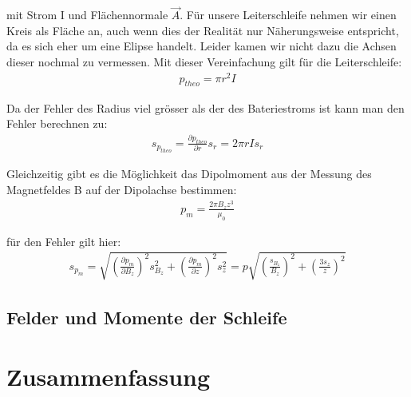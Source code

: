 \documentclass[12pt]{article}
\begin{document}
mit Strom I und Flächennormale $\vec{A}$. Für unsere Leiterschleife nehmen wir einen Kreis als Fläche an, auch wenn dies der Realität nur Näherungsweise entspricht, da es sich eher um eine Elipse handelt. Leider kamen wir nicht dazu die Achsen dieser nochmal zu vermessen. Mit dieser Vereinfachung gilt für die Leiterschleife:
\begin{align}
 p_{theo}=\pi r^2 I
\end{align}

Da der Fehler des Radius viel grösser als der des Bateriestroms ist kann man den Fehler berechnen zu:
\begin{align}
 s_{p_{theo}}= \frac{\partial p_{theo}}{\partial r} s_r=2\pi r I s_r
\end{align}

Gleichzeitig gibt es die Möglichkeit das Dipolmoment aus der Messung des Magnetfeldes B auf der Dipolachse bestimmen:
\begin{align}
 p_m=\frac{2\pi B_z z^3}{\mu_0}
\end{align}

für den Fehler gilt hier:
\begin{align}
 s_{p_m}=\sqrt{\left( \frac{\partial p_m}{\partial B_z}\right) ^2 s_{B_z}^2+ \left( \frac{\partial p_m}{\partial z}\right) ^2 s_z^2} = p \sqrt{\left( \frac{s_{B_z}}{B_z}\right) ^2 + \left( \frac{3 s_z}{z}\right) ^2}
\end{align}

\subsection{Felder und Momente der Schleife}


\section{Zusammenfassung}
\end{document}
